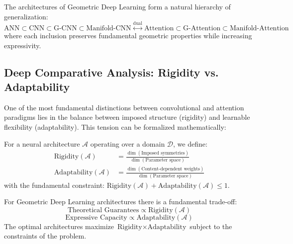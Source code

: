 \begin{remark}\label{rem:jerarquia_generalizacion}
The architectures of Geometric Deep Learning form a natural hierarchy of generalization:
\begin{equation}
\text{ANN} \subset \text{CNN} \subset \text{G-CNN} \subset \text{Manifold-CNN} \stackrel{\text{dual}}{\leftrightarrow} \text{Attention} \subset \text{G-Attention} \subset \text{Manifold-Attention}
\end{equation}
where each inclusion preserves fundamental geometric properties while increasing expressivity.
\end{remark}

\subsection{Deep Comparative Analysis: Rigidity vs. Adaptability}\label{subsec:rigidez_adaptabilidad}

One of the most fundamental distinctions between convolutional and attention paradigms lies in the balance between imposed structure (rigidity) and learnable flexibility (adaptability). This tension can be formalized mathematically:

\begin{definition}\label{def:espectro_rigidez_adaptabilidad}
For a neural architecture $\mathcal{A}$ operating over a domain $\mathcal{D}$, we define:
\begin{align}
    \text{Rigidity}(\mathcal{A}) &= \frac{\dim(\text{Imposed symmetries})}{\dim(\text{Parameter space})} \\
    \text{Adaptability}(\mathcal{A}) &= \frac{\dim(\text{Content-dependent weights})}{\dim(\text{Parameter space})}
\end{align}
with the fundamental constraint: $\text{Rigidity}(\mathcal{A}) + \text{Adaptability}(\mathcal{A}) \leq 1$.
\end{definition}

\begin{remark}\label{rem:tradeoff_rigidez_adaptabilidad}
For Geometric Deep Learning architectures there is a fundamental trade-off:
\begin{equation}
    \text{Theoretical Guarantees} \propto \text{Rigidity}(\mathcal{A})
\end{equation}
\begin{equation}
    \text{Expressive Capacity} \propto \text{Adaptability}(\mathcal{A})
\end{equation}
The optimal architectures maximize $\text{Rigidity} \times \text{Adaptability}$ subject to the constraints of the problem.
\end{remark}

